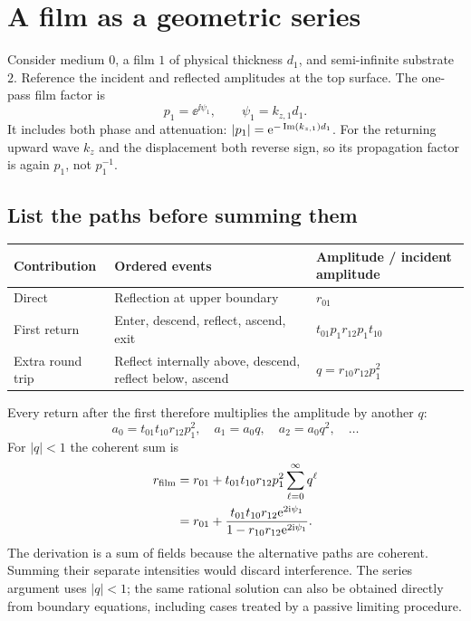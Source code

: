 \section{A film as a geometric series}
Consider medium $0$, a film $1$ of physical thickness $d_1$, and semi-infinite substrate $2$. Reference the incident and reflected amplitudes at the top surface. The one-pass film factor is
\begin{equation}
p_1=\ee^{\ii\psi_1},\qquad \psi_1=k_{z,1}d_1.
\end{equation}
It includes both phase and attenuation: $|p_1|=\mathrm{e}^{-\operatorname{Im}(k_{z,1})d_1}$.
For the returning upward wave $k_z$ and the displacement both reverse sign, so its propagation factor is again $p_1$, not $p_1^{-1}$.

\subsection{List the paths before summing them}
\begin{center}
\begin{tabularx}{\textwidth}{@{}lYl@{}}\toprule
Contribution & Ordered events & Amplitude / incident amplitude\\\midrule
Direct & Reflection at upper boundary & $r_{01}$\\
First return & Enter, descend, reflect, ascend, exit & $t_{01}p_1r_{12}p_1t_{10}$\\
Extra round trip & Reflect internally above, descend, reflect below, ascend & $q=r_{10}r_{12}p_1^2$\\\bottomrule
\end{tabularx}
\end{center}
Every return after the first therefore multiplies the amplitude by another $q$:
\begin{equation}
a_0=t_{01}t_{10}r_{12}p_1^2,\quad
 a_1=a_0q,\quad a_2=a_0q^2,\quad\ldots
\end{equation}
For $|q|<1$ the coherent sum is
\begin{align}
r_{\rm film}&=r_{01}+t_{01}t_{10}r_{12}p_1^2
\sum_{\ell=0}^{\infty}q^\ell\\
&=r_{01}+\frac{t_{01}t_{10}r_{12}\mathrm{e}^{2\mathrm{i}\psi_1}}
{1-r_{10}r_{12}\mathrm{e}^{2\mathrm{i}\psi_1}}.
\label{eq:filmsum}
\end{align}
The derivation is a sum of fields because the alternative paths are coherent. Summing their separate intensities would discard interference. The series argument uses $|q|<1$; the same rational solution can also be obtained directly from boundary equations, including cases treated by a passive limiting procedure.

